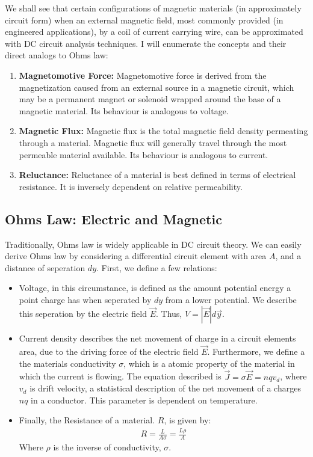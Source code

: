 \documentclass{book}
\begin{document}
We shall see that certain configurations of magnetic materials (in approximately circuit form) when an external magnetic field, most commonly provided (in engineered applications), by a coil of current carrying wire, can be approximated with DC circuit analysis techniques. I will enumerate the concepts and their direct analogs to Ohms law:

\begin{enumerate}
	\item \textbf{Magnetomotive Force:} Magnetomotive force is derived from the magnetization caused from an external source in a magnetic circuit, which may be a permanent magnet or solenoid wrapped around the base of a magnetic material. Its behaviour is analogous to voltage.

	\item \textbf{Magnetic Flux:} Magnetic flux is the total magnetic field density permeating through a material. Magnetic flux will generally travel through the most permeable material available. Its behaviour is analogous to current. 
	\item \textbf{Reluctance:} Reluctance of a material is best defined in terms of electrical resistance. It is inversely dependent on relative permeability.  
\end{enumerate}

\subsection{Ohms Law: Electric and Magnetic}

Traditionally, Ohms law is widely applicable in DC circuit theory. We can easily derive Ohms law by considering a differential circuit element with area $A$, and a distance of seperation $dy$. First, we define a few relations:

\begin{itemize}
	\item Voltage, in this circumstance, is defined as the amount potential energy a point charge has when seperated by $dy$ from a lower potential. We describe this seperation by the electric field $\vec{E}$. Thus, $V=|\vec{E}| d\vec{y}$.
	\item Current density describes the net movement of charge in a circuit elements area, due to the driving force of the electric field $\vec{E}$. Furthermore, we define a the materials conductivity $\sigma$, which is a atomic property of the material in which the current is flowing. The equation described is $\vec{J} = \sigma \vec{E} = n q v_d$, where $v_d$ is drift velocity, a statistical description of the net movement of a charges $nq$ in a conductor. This parameter is dependent on temperature.   
	\item Finally, the Resistance of a material. $R$, is given by: 
	\begin{align*}
		R = \frac{L}{A \sigma} = \frac{L \rho}{A}
	\end{align*}
	Where $\rho$ is the inverse of conductivity, $\sigma$.
\end{itemize}
\end{document}
